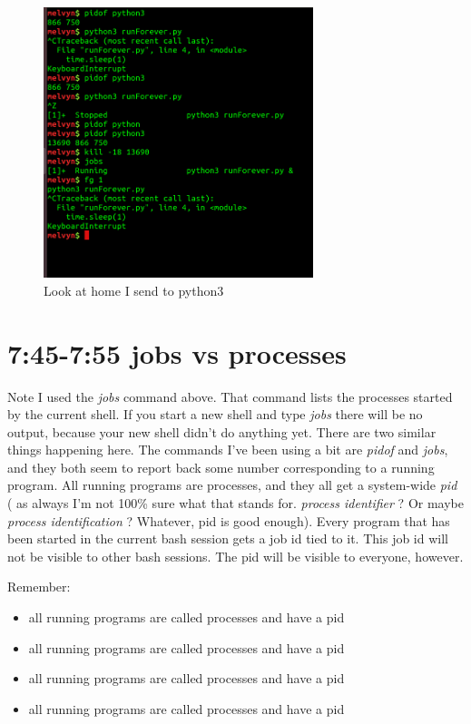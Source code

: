 \documentclass[8pt]{article}
\begin{document}
\begin{figure}[ht]
	\centering
	\includegraphics[width=0.7\textwidth]{signals.png}
	\caption{Look at home I send to python3}
	\label{fig:pythonsignals}
\end{figure}

\section{7:45-7:55 jobs vs processes}
Note I used the \textit{jobs} command above. That command lists the processes started by the current shell. If you start a new shell and type \textit{jobs} there will be no output, because your new shell didn't do anything yet.
There are two similar things happening here. The commands I've been using a bit
are \textit{pidof} and \textit{jobs}, and they both seem to report back some
number corresponding to a running program. All running programs are processes,
and they all get a system-wide \textit{pid} ( as always I'm not 100\% sure what
that stands for. \textit{process identifier} ? Or maybe \textit{process
identification} ? Whatever, pid is good enough). Every program that has been
started in the current bash session gets a job id tied to it. This job id will
not be visible to other bash sessions. The pid will be visible to everyone,
however.

Remember:
\begin{itemize}
\item all running programs are called processes and have a pid
\item all running programs are called processes and have a pid
\item all running programs are called processes and have a pid
\item all running programs are called processes and have a pid
\end{itemize}
\end{document}

